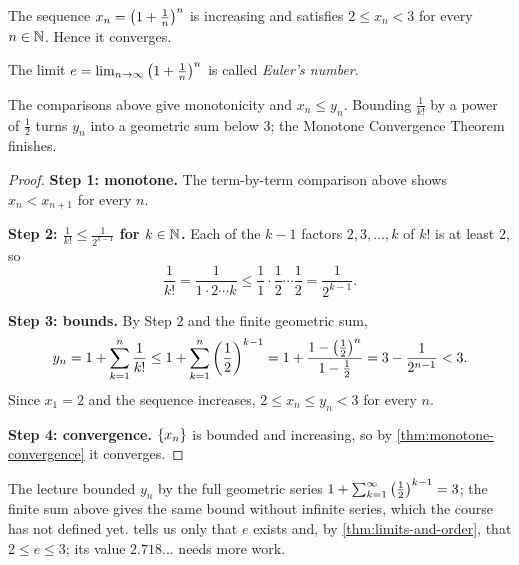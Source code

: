\begin{proposition}\label{prop:e-limit}
    The sequence $x_n=\left(1+\frac1n\right)^n$ is increasing and satisfies $2\leq x_n<3$ for every $n\in\mathbb{N}$. Hence it converges.
\end{proposition}
\begin{definition}\label{def:e}
    The limit $e=\lim_{n\to\infty}\left(1+\frac1n\right)^n$ is called \emph{Euler's number}.
\end{definition}
\begin{idea}
    The comparisons above give monotonicity and $x_n\leq y_n$. Bounding $\frac1{k!}$ by a power of $\frac12$ turns $y_n$ into a geometric sum below $3$; the Monotone Convergence Theorem finishes.
\end{idea}
\begin{proof}
    \textbf{Step 1: monotone.} The term-by-term comparison above shows $x_n<x_{n+1}$ for every $n$.

    \textbf{Step 2: $\frac1{k!}\leq\frac1{2^{k-1}}$ for $k\in\mathbb{N}$.} Each of the $k-1$ factors $2,3,\dots,k$ of $k!$ is at least $2$, so
    \begin{equation*}
        \frac{1}{k!} = \frac{1}{1 \cdot 2 \cdots k} \leq \frac{1}{1} \cdot \frac{1}{2} \cdots \frac{1}{2} = \frac{1}{2^{k - 1}}.
    \end{equation*}

    \textbf{Step 3: bounds.} By Step 2 and the finite geometric sum,
    \begin{equation*}
        y_n = 1 + \sum_{k = 1}^{n} \frac{1}{k!} \leq 1 + \sum_{k = 1}^{n} \left(\frac{1}{2}\right)^{k - 1}
        = 1 + \frac{1-\left(\frac12\right)^n}{1-\frac12} = 3-\frac1{2^{n-1}} < 3.
    \end{equation*}
    Since $x_1=2$ and the sequence increases, $2\leq x_n\leq y_n<3$ for every $n$.

    \textbf{Step 4: convergence.} $\left\{x_n\right\}$ is bounded and increasing, so by \cref{thm:monotone-convergence} it converges.
\end{proof}
The lecture bounded $y_n$ by the full geometric series $1+\sum_{k=1}^{\infty}\left(\frac12\right)^{k-1}=3$; the finite sum above gives the same bound without infinite series, which the course has not defined yet.  tells us only that $e$ exists and, by \cref{thm:limits-and-order}, that $2\leq e\leq3$; its value $2.718\ldots$ needs more work.

